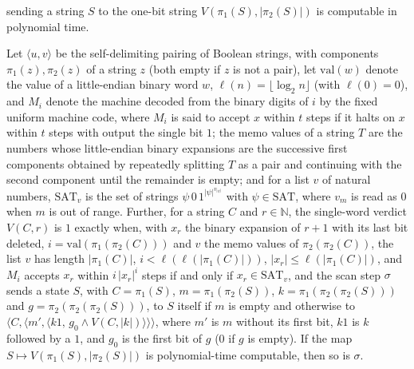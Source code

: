 \begin{theorem}
sending a string $S$ to the one-bit string $V(\pi_1(S),|\pi_2(S)|)$ is computable in polynomial
time.
\end{theorem}

\begin{theorem}
\label{Complexity.ladner_testStep_FP}
\leanok
{}
Let $\langle u,v\rangle$ be the self-delimiting pairing of Boolean strings, with components $\pi_1(z),\pi_2(z)$ of a string $z$ (both empty if $z$ is not a pair), let $\mathrm{val}(w)$ denote the value of a little-endian binary word $w$, $\ell(n)=\lfloor\log_2 n\rfloor$ (with $\ell(0)=0$), and $M_i$ denote the machine decoded from the binary digits of $i$ by the fixed uniform machine code, where $M_i$ is said to accept $x$ within $t$ steps if it halts on $x$ within $t$ steps with output the single bit $1$; the memo values of a string $T$ are the numbers whose little-endian binary expansions are the successive first components obtained by repeatedly splitting $T$ as a pair and continuing with the second component until the remainder is empty; and for a list $v$ of natural numbers, $\mathrm{SAT}_v$ is the set of strings $\psi\,0\,1^{|\psi|^{v_{|\psi|}}}$ with $\psi\in\mathrm{SAT}$, where $v_m$ is read as $0$ when $m$ is out of range. Further, for a string $C$ and $r\in\mathbb N$, the single-word verdict $V(C,r)$ is $1$ exactly when, with $x_r$ the binary expansion of $r+1$ with its last bit deleted, $i=\mathrm{val}(\pi_1(\pi_2(C)))$ and $v$ the memo values of $\pi_2(\pi_2(C))$, the list $v$ has length $|\pi_1(C)|$, $i<\ell(\ell(|\pi_1(C)|))$, $|x_r|\le\ell(|\pi_1(C)|)$, and $M_i$ accepts $x_r$ within $i\,|x_r|^i$ steps if and only if $x_r\in\mathrm{SAT}_v$, and the scan step $\sigma$ sends a state $S$, with $C=\pi_1(S)$, $m=\pi_1(\pi_2(S))$, $k=\pi_1(\pi_2(\pi_2(S)))$ and $g=\pi_2(\pi_2(\pi_2(S)))$, to $S$ itself if $m$ is empty and otherwise to $\langle C,\langle m',\langle k1,\,g_0\wedge V(C,|k|)\rangle\rangle\rangle$, where $m'$ is $m$ without its first bit, $k1$ is $k$ followed by a $1$, and $g_0$ is the first bit of $g$ ($0$ if $g$ is empty). If the map
$S\mapsto V(\pi_1(S),|\pi_2(S)|)$ is polynomial-time computable, then so is $\sigma$.
\end{theorem}

